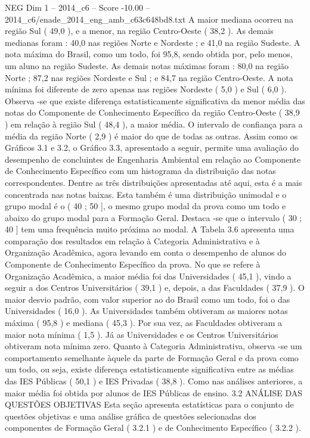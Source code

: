 \begin{textsample}{NEG Dim 1 – 2014\_c6 – Score -10.00 – 2014\_c6/enade\_2014\_eng\_amb\_c63c648bd8.txt}
A maior mediana ocorreu na região Sul ( 49,0 ), e a menor, na região Centro-Oeste ( 38,2 ).
As demais medianas foram : 40,0 nas regiões Norte e Nordeste ; e 41,0 na região Sudeste.
A nota máxima do Brasil, como um todo, foi 95,8, sendo obtida por, pelo menos, um aluno na região Sudeste.
As demais notas máximas foram : 80,0 na região Norte ; 87,2 nas regiões Nordeste e Sul ; e 84,7 na região Centro-Oeste.
A nota mínima foi diferente de zero apenas nas regiões Nordeste ( 5,0 ) e Sul ( 6,0 ).
Observa -se que existe diferença estatisticamente significativa da menor média das notas do Componente de Conhecimento Específico da região Centro-Oeste ( 38,9 ) em relação à região Sul ( 48,4 ), a maior média.
O intervalo de confiança para a média da região Norte ( 2,9 ) é maior do que de todas as outras.
Assim como os Gráficos 3.1 e 3.2, o Gráfico 3.3, apresentado a seguir, permite uma avaliação do desempenho de concluintes de Engenharia Ambiental em relação ao Componente de Conhecimento Específico com um histograma da distribuição das notas correspondentes.
Dentre as três distribuições apresentadas até aqui, esta é a mais concentrada nas notas baixas.
Esta também é uma distribuição unimodal e o grupo modal é o ( 40 ; 50 ], o mesmo grupo modal da prova como um todo e abaixo do grupo modal para a Formação Geral.
Destaca -se que o intervalo ( 30 ; 40 ] tem uma frequência muito próxima ao modal.
A Tabela 3.6 apresenta uma comparação dos resultados em relação à Categoria Administrativa e à Organização Acadêmica, agora levando em conta o desempenho de alunos do Componente de Conhecimento Específico da prova.
No que se refere à Organização Acadêmica, a maior média foi das Universidades ( 45,1 ), vindo a seguir a dos Centros Universitários ( 39,1 ) e, depois, a das Faculdades ( 37,9 ).
O maior desvio padrão, com valor superior ao do Brasil como um todo, foi o das Universidades ( 16,0 ).
As Universidades também obtiveram as maiores notas máxima ( 95,8 ) e mediana ( 45,3 ).
Por sua vez, as Faculdades obtiveram a maior nota mínima ( 1,5 ).
Já as Universidades e os Centros Universitários obtiveram nota mínima zero.
Quanto à Categoria Administrativa, observa -se um comportamento semelhante àquele da parte de Formação Geral e da prova como um todo, ou seja, existe diferença estatisticamente significativa entre as médias das IES Públicas ( 50,1 ) e IES Privadas ( 38,8 ).
Como nas análises anteriores, a maior média foi obtida por alunos de IES Públicas de ensino. 3.2 ANÁLISE DAS QUESTÕES OBJETIVAS Esta seção apresenta estatísticas para o conjunto de questões objetivas e uma análise gráfica de questões selecionadas dos componentes de Formação Geral ( 3.2.1 ) e de Conhecimento Específico ( 3.2.2 ).

\end{textsample}
